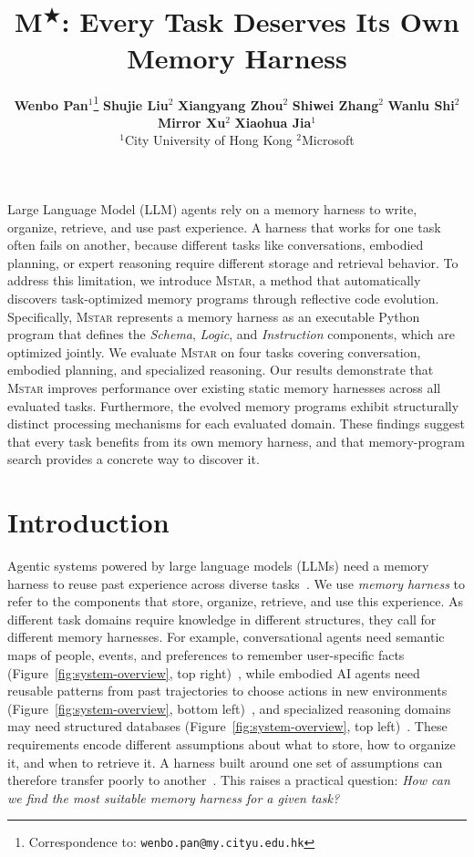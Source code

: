 \documentclass{article}
\title{M\textsuperscript{$\bigstar$}: Every Task Deserves Its Own Memory Harness}
\author{
  \textbf{Wenbo Pan}$^{1}$\thanks{Correspondence to: \texttt{wenbo.pan@my.cityu.edu.hk}} \quad
  \textbf{Shujie Liu}$^{2}$ \quad
  \textbf{Xiangyang Zhou}$^{2}$ \quad
  \textbf{Shiwei Zhang}$^{2}$ \quad
  \textbf{Wanlu Shi}$^{2}$ \\[0.3em]
  \textbf{Mirror Xu}$^{2}$ \quad
  \textbf{Xiaohua Jia}$^{1}$ \\[0.5em]
  $^{1}$City University of Hong Kong \qquad
  $^{2}$Microsoft
}
\renewenvironment{abstract}{%
  \begin{tcolorbox}[
    enhanced,
    breakable,
    colback=abstractbg,
    colframe=black!15,
    boxrule=0.4pt,
    arc=4pt,
    left=6pt,
    right=6pt,
    bottom=6pt,
    top=6pt,
    shadow={1pt}{-1pt}{0pt}{black!8},
  ]
  \small\noindent\tcbox[on line, colback=black!8, colframe=black!8, boxrule=0pt, arc=2pt, left=2pt, right=2pt, top=1pt, bottom=1pt]{\textbf{\normalsize Abstract}}\enspace
}{%
  \end{tcolorbox}
}
\newcommand{\sysname}{\textsc{Mstar}}
\begin{document}
\maketitle



\begin{abstract}
Large Language Model (LLM) agents rely on a memory harness to write, organize, retrieve, and use past experience.
A harness that works for one task often fails on another, because different tasks like conversations, embodied planning, or expert reasoning require different storage and retrieval behavior.
To address this limitation, we introduce \sysname{}, a method that automatically discovers task-optimized memory programs through reflective code evolution.
Specifically, \sysname{} represents a memory harness as an executable Python program that defines the \textit{Schema}, \textit{Logic}, and \textit{Instruction} components, which are optimized jointly.
We evaluate \sysname{} on four tasks covering conversation, embodied planning, and specialized reasoning.
Our results demonstrate that \sysname{} improves performance over existing static memory harnesses across all evaluated tasks.
Furthermore, the evolved memory programs exhibit structurally distinct processing mechanisms for each evaluated domain.
These findings suggest that every task benefits from its own memory harness, and that memory-program search provides a concrete way to discover it.
\end{abstract}

\section{Introduction}

Agentic systems powered by large language models (LLMs) need a memory harness to reuse past experience across diverse tasks~\citep{zhang2024survey_memory,park2023generative,zhong2024memorybank,wang2024augmenting}.
We use \textit{memory harness} to refer to the components that store, organize, retrieve, and use this experience.
As different task domains require knowledge in different structures, they call for different memory harnesses.
For example, conversational agents need semantic maps of people, events, and preferences to remember user-specific facts (Figure~\ref{fig:system-overview}, top right)~\citep{locomo}, while embodied AI agents need reusable patterns from past trajectories to choose actions in new environments (Figure~\ref{fig:system-overview}, bottom left)~\citep{alfworld}, and specialized reasoning domains may need structured databases (Figure~\ref{fig:system-overview}, top left)~\citep{prbench}.
These requirements encode different assumptions about what to store, how to organize it, and when to retrieve it.
A harness built around one set of assumptions can therefore transfer poorly to another~\citep{structmemeval}.
This raises a practical question: \textit{How can we find the most suitable memory harness for a given task?}
\end{document}
